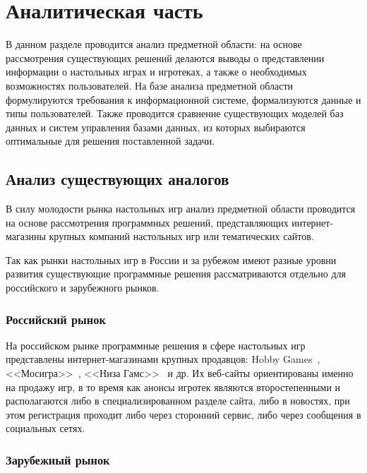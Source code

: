 \chapter{\label{analys}Аналитическая часть}

\begin{comment}
\end{comment}

В данном разделе проводится анализ предметной области: на основе рассмотрения
существующих решений делаются выводы о представлении информации о настольных
играх и игротеках, а также о необходимых возможностях пользователей. На базе
анализа предметной области формулируются требования к информационной системе,
формализуются данные и типы пользователей. Также проводится сравнение
существующих моделей баз данных и систем управления базами данных, из которых
выбираются оптимальные для решения поставленной задачи.

\section{Анализ существующих аналогов}

В силу молодости рынка настольных игр анализ предметной области проводится на
основе рассмотрения программных решений, представляющих интернет-магазины
крупных компаний настольных игр или тематических сайтов.

Так как рынки настольных игр в России и за рубежом имеют разные уровни развития
существующие программные решения рассматриваются отдельно для российского и
зарубежного рынков.

\subsection{Российский рынок}

На российском рынке программные решения в сфере настольных игр представлены
интернет-магазинами крупных продавцов: Hobby Games~\cite{site01},
<<Мосигра>>~\cite{site02}, <<Низа Гамс>>~\cite{site03} и др. Их веб-сайты
ориентированы именно на продажу игр, в то время как анонсы игротек являются
второстепенными и располагаются либо в специализированном разделе сайта, либо в
новостях, при этом регистрация проходит либо через сторонний сервис, либо через
сообщения в социальных сетях.

\subsection{Зарубежный рынок}

